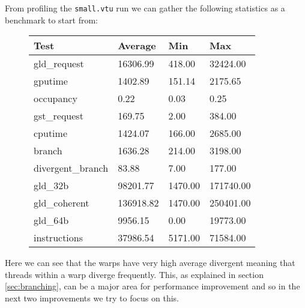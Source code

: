 From profiling the \texttt{small.vtu} run we can gather the following statistics as a benchmark to start from:\\
\begin{figure}[H]\centering \begin{tabular}{ l | l | l | l}
\hline
Test & Average & Min & Max \\
\hline
\hline
gld\_request & 16306.99 & 418.00 & 32424.00 \\
gputime & 1402.89 & 151.14 & 2175.65 \\
occupancy & 0.22 & 0.03 & 0.25 \\
gst\_request & 169.75 & 2.00 & 384.00 \\
cputime & 1424.07 & 166.00 & 2685.00 \\
branch & 1636.28 & 214.00 & 3198.00 \\
divergent\_branch & 83.88 & 7.00 & 177.00 \\
gld\_32b & 98201.77 & 1470.00 & 171740.00 \\
gld\_coherent & 136918.82 & 1470.00 & 250401.00 \\
gld\_64b & 9956.15 & 0.00 & 19773.00 \\
instructions & 37986.54 & 5171.00 & 71584.00 \\
\hline
\end{tabular} \end{figure}

Here we can see that the warps have very high average divergent meaning that threads within a warp diverge frequently. This, as explained in section \ref{sec:branching}, can be a major area for performance improvement and so in the next two improvements we try to focus on this.
